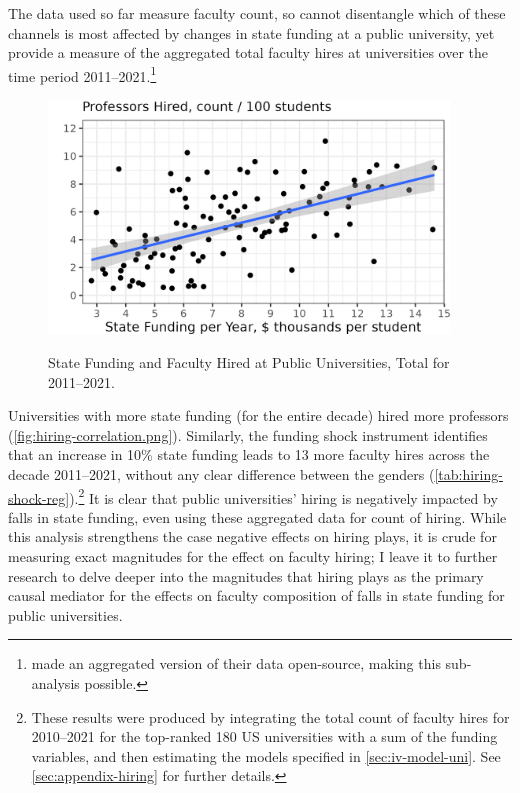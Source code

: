 The data used so far measure faculty count, so cannot disentangle which of these channels is most affected by changes in state funding at a public university, yet \cite{wapman2022quantifying} provide a measure of the aggregated total faculty hires at universities over the time period 2011--2021.\footnote{
    \citep{wapman2022quantifying} made an aggregated version of their data open-source, making this sub-analysis possible.
}
\begin{figure}[h!]
    \centering
    \singlespacing
    \caption{State Funding and Faculty Hired at Public Universities, Total for 2011--2021.}
    \includegraphics[width=0.95\textwidth]{figures/hiring-correlation.png}
    \label{fig:hiring-correlation.png}
\end{figure}

Universities with more state funding (for the entire decade) hired more professors (\autoref{fig:hiring-correlation.png}).
Similarly, the funding shock instrument identifies that an increase in 10\% state funding leads to 13 more faculty hires across the decade 2011--2021, without any clear difference between the genders (\autoref{tab:hiring-shock-reg}).\footnote{
    These results were produced by integrating the total count of faculty hires for 2010--2021 for the top-ranked 180 US universities with a sum of the funding variables, and then estimating the models specified in \autoref{sec:iv-model-uni}.
    See \autoref{sec:appendix-hiring} for further details.
}
It is clear that public universities' hiring is negatively impacted by falls in state funding, even using these aggregated data for count of hiring. 
While this analysis strengthens the case negative effects on hiring plays, it is crude for measuring exact magnitudes for the effect on faculty hiring; I leave it to further research to delve deeper into the magnitudes that hiring plays as the primary causal mediator for the effects on faculty composition of falls in state funding for public universities.
